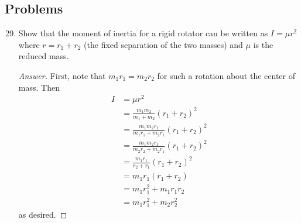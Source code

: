\documentclass[../notes.tex]{subfiles}
\begin{document}
\subsection*{Problems}
\begin{enumerate}[label={\textbf{5-\arabic*.}},ref={5-\arabic*}]
    \setcounter{enumi}{28}
    \item \label{prb:5-29}Show that the moment of inertia for a rigid rotator can be written as $I=\mu r^2$ where $r=r_1+r_2$ (the fixed separation of the two masses) and $\mu$ is the reduced mass.
    \begin{proof}[Answer]
        First, note that $m_1r_1=m_2r_2$ for such a rotation about the center of mass. Then
        \begingroup
        \allowdisplaybreaks
        \begin{align*}
            I &= \mu r^2\\
            &= \frac{m_1m_2}{m_1+m_2}(r_1+r_2)^2\\
            &= \frac{m_1m_2r_1}{m_1r_1+m_2r_1}(r_1+r_2)^2\\
            &= \frac{m_1m_2r_1}{m_2r_2+m_2r_1}(r_1+r_2)^2\\
            &= \frac{m_1r_1}{r_2+r_1}(r_1+r_2)^2\\
            &= m_1r_1(r_1+r_2)\\
            &= m_1r_1^2+m_1r_1r_2\\
            &= m_1r_1^2+m_2r_2^2
        \end{align*}
        \endgroup
        as desired.
    \end{proof}
\end{enumerate}
\end{document}
